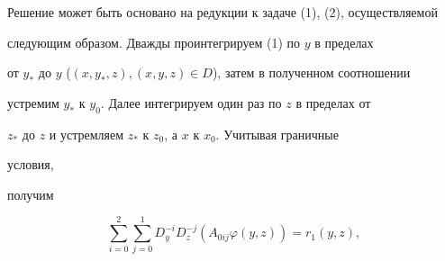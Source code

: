 \medskip 


 


Решение может быть основано на редукции к задаче (1), (2), осуществляемой 


следующим образом. Дважды проинтегрируем (1) по $y$ в пределах 


от $y_*$ до $y$ ($(x,y_*,z),(x,y,z)\in D$), затем в полученном соотношении 


устремим $y_*$ к $y_0$. Далее интегрируем один раз по $z$ в пределах от 


$z_*$ до $z$ и устремляем $z_*$ к $z_0$, а $x$ к $x_0$. Учитывая граничные 


условия, 


получим 


\begin{equation} 


\sum^2_{i=0}\sum^1_{j=0}D^{-i}_y D^{-j}_z 


(A_{0ij}\varphi(y,z))=r_1(y,z), 


\end{equation} 


